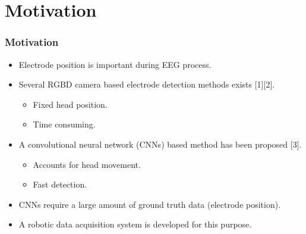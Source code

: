 \section{Motivation}
\begin{frame}
	\frametitle{Motivation}
	\begin{itemize}
		\item Electrode position is important during EEG process.
		\item Several RGBD camera  based electrode detection methods exists [1][2].
		\begin{itemize}
			\item Fixed head position.
			\item Time consuming.
		\end{itemize} 
		\item A convolutional neural network (CNNs) based method has been proposed [3].
		\begin{itemize}
			\item Accounts for head movement.
			\item Fast detection.
		\end{itemize}
		\item CNNs require a large amount of ground truth data (electrode position).
		\item A robotic data acquisition system is developed for this purpose.
	\end{itemize}
\end{frame}





